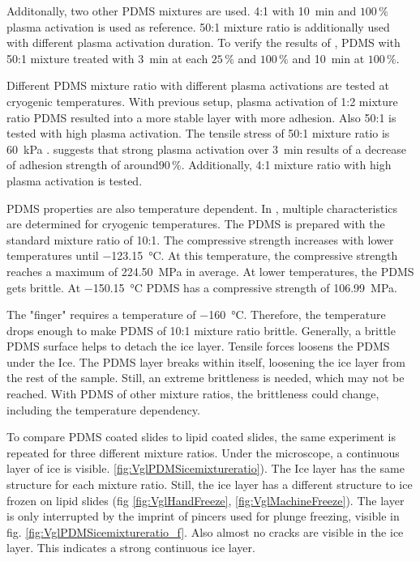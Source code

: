 Additonally, two other PDMS mixtures are used. 4:1 with \SI{10}{\minute} and $100\,\%$ plasma activation is used as reference. 50:1 mixture ratio is additionally used with different plasma activation duration. To verify the results of \cite{Ohishi.2017}, PDMS with 50:1 mixture treated with \SI{3}{\minute} at each $25\,\%$ and $100\,\%$ and \SI{10}{\minute} at $100\,\%$. 

Different PDMS mixture ratio with different plasma activations are tested at cryogenic temperatures. With previous setup, plasma activation of 1:2 mixture ratio PDMS resulted into a more stable layer with more adhesion. Also 50:1 is tested with high plasma activation. The tensile stress of 50:1 mixture ratio is \SI{60}{\kilo\pascal} \cite{IbanezIbanez.2022}.  \cite{Ohishi.2017} suggests that strong plasma activation over \SI{3}{\minute} results of a decrease of adhesion strength of around$90\,\%$. Additionally, 4:1 mixture ratio with high plasma activation is tested.

PDMS properties are also temperature dependent. In \cite{Zhang.2020}, multiple characteristics are determined for cryogenic temperatures. The PDMS is prepared with the standard mixture ratio of 10:1. The compressive strength increases with lower temperatures until \SI{-123.15}{\degreeCelsius}. At this temperature, the compressive strength reaches a maximum of \SI{224.50}{\mega\pascal} in average. At lower temperatures, the PDMS gets brittle. At \SI{-150.15}{\degreeCelsius} PDMS has a compressive strength of \SI{106.99}{\mega\pascal}.

The "finger" requires a temperature of \SI{-160}{\degreeCelsius}. Therefore, the temperature drops enough to make PDMS of 10:1 mixture ratio brittle. Generally, a brittle PDMS surface helps to detach the ice layer. Tensile forces loosens the PDMS under the Ice. The PDMS layer breaks within itself, loosening the ice layer from the rest of the sample. Still, an extreme brittleness is needed, which may not be reached. With PDMS of other mixture ratios, the brittleness could change, including the temperature dependency.

To compare PDMS coated slides to lipid coated slides, the same experiment is repeated for three different mixture ratios. Under the microscope, a continuous layer of ice is visible. \ref{fig:VglPDMSicemixtureratio}). The Ice layer has the same structure for each mixture ratio. Still, the ice layer has a different structure to ice frozen on lipid slides (fig \ref{fig:VglHandFreeze}, \ref{fig:VglMachineFreeze}). The layer is only interrupted by the imprint of pincers used for plunge freezing, visible in fig. \ref{fig:VglPDMSicemixtureratio_f}. Also almost no cracks are visible in the ice layer. This indicates a strong continuous ice layer.

